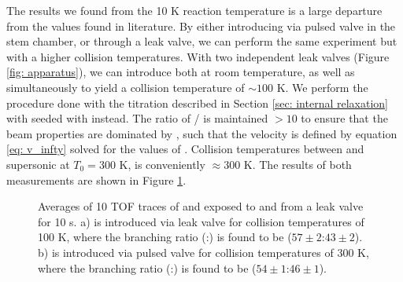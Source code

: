 The results we found from the 10 K reaction temperature is a large departure from the values found in literature. By either introducing  via pulsed valve in the stem chamber, or through a leak valve, we can perform the same experiment but with a higher collision temperatures. With two independent leak valves (Figure \ref{fig: apparatus}), we can introduce both  at room temperature, as well as  simultaneously to yield a collision temperature of $\sim 100$ K. We perform the procedure done with the  titration described in Section \ref{sec: internal relaxation} with  seeded with  instead. The ratio of / is maintained $>10$ to ensure that the beam properties are dominated by , such that the velocity is defined by equation \ref{eq: v_infty} solved for the values of . Collision temperatures between  and supersonic  at $T_0=300$ K, is conveniently $\approx 300$ K. The results of both measurements are shown in Figure \ref{fig: C+H2O high temp}.

\begin{figure}[H]
	\centering
	\caption{Averages of 10 TOF traces of  and  exposed to  and  from a leak valve for 10 s. a)  is introduced via leak valve for collision temperatures of 100 K, where the branching ratio (:\ce{[HCO]+}) is found to be ($57\pm2$:$43\pm2$). b)  is introduced via pulsed valve for collision temperatures of 300 K, where the branching ratio (:\ce{[HCO]+}) is found to be ($54\pm1$:$46\pm1$).}
	\label{fig: C+H2O high temp}
\end{figure}

